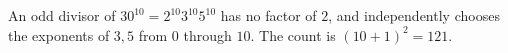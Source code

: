 An odd divisor of $30^{10}=2^{10}3^{10}5^{10}$ has no factor of $2$, and independently chooses the exponents of $3,5$ from $0$ through $10$. The count is $(10+1)^2=\boxed{121}$.
